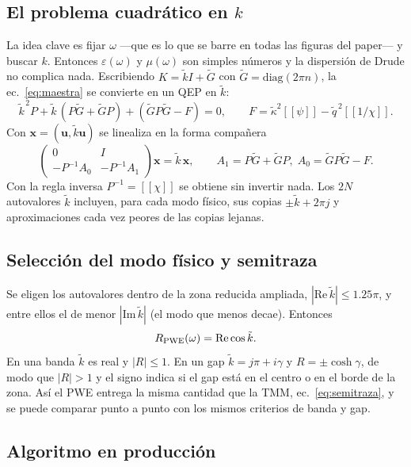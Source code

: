 \documentclass[11pt,a4paper]{article}
\newcommand{\toep}[1]{[\![#1]\!]}
\newcommand{\kt}{\tilde k}
\begin{document}
\subsection{El problema cuadrático en $k$}

La idea clave es fijar $\omega$ ---que es lo que se barre en todas las figuras
del paper--- y buscar $k$. Entonces $\varepsilon(\omega)$ y $\mu(\omega)$ son
simples números y la dispersión de Drude no complica nada. Escribiendo
$K=\kt I+\tilde G$ con $\tilde G=\mathrm{diag}(2\pi n)$, la ec.~\eqref{eq:maestra}
se convierte en un QEP en $\kt$:
\begin{equation}
\boxed{\;\kt^{\,2}P+\kt\,(P\tilde G+\tilde GP)+(\tilde GP\tilde G-F)=0,\qquad
F=\tilde\kappa^2\toep{\psi}-\tilde q^{\,2}\toep{1/\chi}.\;}
\label{eq:qep-k}
\end{equation}
Con $\mathbf x=(\mathbf u,\kt\mathbf u)$ se linealiza en la forma compañera
\begin{equation}
\begin{pmatrix}0&I\\-P^{-1}A_0&-P^{-1}A_1\end{pmatrix}\mathbf x=\kt\,\mathbf x,
\qquad A_1=P\tilde G+\tilde GP,\;A_0=\tilde GP\tilde G-F .
\label{eq:companion}
\end{equation}
Con la regla inversa $P^{-1}=\toep{\chi}$ se obtiene sin invertir nada. Los
$2N$ autovalores $\kt$ incluyen, para cada modo físico, sus copias
$\pm\kt+2\pi j$ y aproximaciones cada vez peores de las copias lejanas.

\subsection{Selección del modo físico y semitraza}

Se eligen los autovalores dentro de la zona reducida ampliada,
$|\mathrm{Re}\,\kt|\le1.25\pi$, y entre ellos el de menor $|\mathrm{Im}\,\kt|$
(el modo que menos decae). Entonces
\begin{equation}
R_{\rm PWE}(\omega)=\mathrm{Re}\cos\kt .
\label{eq:rpwe}
\end{equation}
En una banda $\kt$ es real y $|R|\le1$. En un gap
$\kt=j\pi+i\gamma$ y $R=\pm\cosh\gamma$, de modo que $|R|>1$ y el signo indica
si el gap está en el centro o en el borde de la zona. Así el PWE entrega la
misma cantidad que la TMM, ec.~\eqref{eq:semitraza}, y se puede comparar punto a
punto con los mismos criterios de banda y gap.

\subsection{Algoritmo en producción}\label{sec:algoritmo}
\end{document}
